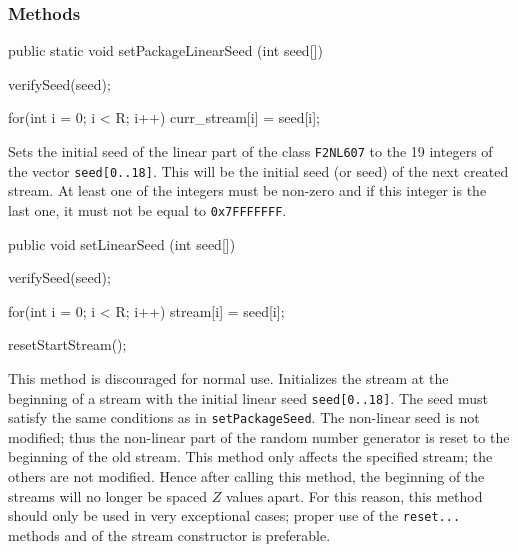 \subsubsection* {Methods}
\begin{code}
   public static void setPackageLinearSeed (int seed[]) \begin{hide} {
      verifySeed(seed);

      for(int i = 0; i < R; i++)
         curr_stream[i] = seed[i];
   } \end{hide}
\end{code}
\begin{tabb} Sets the initial seed of the linear part of the class
  \texttt{F2NL607} to the 19 integers of the vector \texttt{seed[0..18]}.
  This will be the initial seed (or seed) of the next created stream.
  At least one of the integers must be non-zero and if this integer is
  the last one, it must not be equal to \texttt{0x7FFFFFFF}.
\end{tabb}
\begin{htmlonly}
\end{htmlonly}
\begin{code}

   public void setLinearSeed (int seed[]) \begin{hide} {
      verifySeed(seed);

      for(int i = 0; i < R; i++)
         stream[i] = seed[i];

      resetStartStream();
   } \end{hide}
\end{code}
\begin{tabb} This method is discouraged for normal use.
  Initializes the stream at the beginning of a stream with the initial linear
  seed \texttt{seed[0..18]}. The seed must satisfy the same conditions as
  in \texttt{setPackageSeed}.
  The non-linear seed is not modified; thus the non-linear part of the random
  number generator is reset to the beginning of the old stream.
  This method only affects the specified stream; the others are not
  modified. Hence after calling this method, the beginning of the streams
  will no longer be spaced $Z$ values apart.
  For this reason, this method should only be used in very exceptional cases;
  proper use of the \texttt{reset...} methods and of the stream constructor is
  preferable.
\end{tabb}
\begin{htmlonly}
\end{htmlonly}
